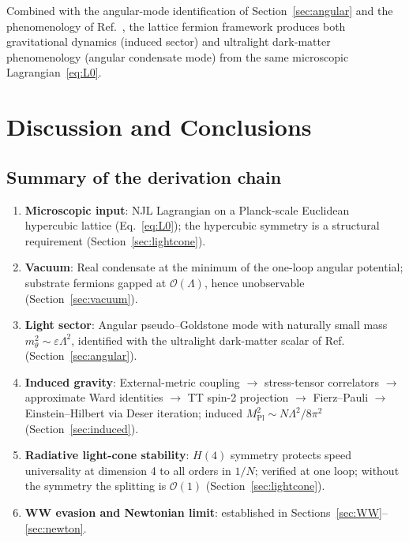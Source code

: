\documentclass[11pt,a4paper]{article}
\begin{document}
Combined with the angular-mode identification of
Section~\ref{sec:angular} and the phenomenology of
Ref.~\cite{Cheng:2025sparc}, the lattice fermion framework
produces both gravitational dynamics (induced sector) and
ultralight dark-matter phenomenology (angular condensate mode)
from the same microscopic Lagrangian~\eqref{eq:L0}.


\section{Discussion and Conclusions}
\label{sec:discuss}

\subsection{Summary of the derivation chain}

\begin{enumerate}
\item \textbf{Microscopic input}: NJL Lagrangian on a Planck-scale
  Euclidean hypercubic lattice (Eq.~\ref{eq:L0}); the hypercubic
  symmetry is a structural requirement
  (Section~\ref{sec:lightcone}).
\item \textbf{Vacuum}: Real condensate at the minimum of the
  one-loop angular potential; substrate fermions gapped at
  $\mathcal{O}(\Lambda)$, hence unobservable
  (Section~\ref{sec:vacuum}).
\item \textbf{Light sector}: Angular pseudo--Goldstone mode with
  naturally small mass $m_\theta^2 \sim \varepsilon\Lambda^2$,
  identified with the ultralight dark-matter scalar of
  Ref.~\cite{Cheng:2025sparc} (Section~\ref{sec:angular}).
\item \textbf{Induced gravity}: External-metric coupling
  $\to$ stress-tensor correlators $\to$ approximate Ward identities
  $\to$ TT spin-2 projection $\to$ Fierz--Pauli $\to$
  Einstein--Hilbert via Deser iteration; induced
  $M_{\mathrm{Pl}}^2 \sim N\Lambda^2/8\pi^2$
  (Section~\ref{sec:induced}).
\item \textbf{Radiative light-cone stability}: $H(4)$ symmetry
  protects speed universality at dimension 4 to all orders in
  $1/N$; verified at one loop; without the symmetry the splitting
  is $\mathcal{O}(1)$ (Section~\ref{sec:lightcone}).
\item \textbf{WW evasion and Newtonian limit}: established in
  Sections~\ref{sec:WW}--\ref{sec:newton}.
\end{enumerate}
\end{document}
